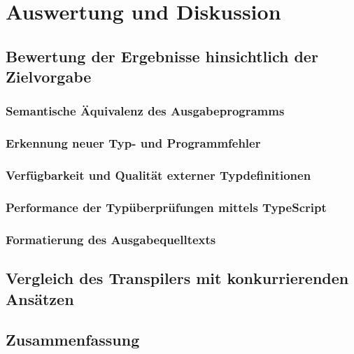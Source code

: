 \chapter{Auswertung und Diskussion}

\section{Bewertung der Ergebnisse hinsichtlich der Zielvorgabe}

  \subsection{Semantische Äquivalenz des Ausgabeprogramms}

  \subsection{Erkennung neuer Typ- und Programmfehler}

  \subsection{Verfügbarkeit und Qualität externer Typdefinitionen}

  \subsection{Performance der Typüberprüfungen mittels TypeScript}

  \subsection{Formatierung des Ausgabequelltexts}

\section{Vergleich des Transpilers mit konkurrierenden Ansätzen}

\section{Zusammenfassung}
